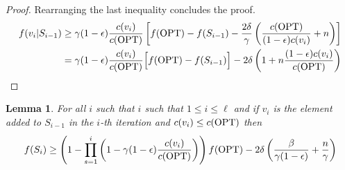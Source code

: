 \documentclass[10pt]{article} %
\newtheorem{lemma}[theorem]{Lemma}
\theoremstyle{remark}
\newcommand{\OPT}{{\rm OPT}}
\begin{document}
\begin{proof}
Rearranging the last inequality concludes the proof. 
\begin{align*}
    f(v_i|S_{i-1}) &\geq \gamma(1-\epsilon)\frac{c(v_i)}{c(\OPT)} \left[f(\OPT)-f(S_{i-1}) - \frac{2\delta}{\gamma} \left( \frac{c(\OPT)}{(1-\epsilon)c(v_i)} + n\right) \right]\\
    &= \gamma(1-\epsilon)\frac{c(v_i)}{c(\OPT)} \Big[ f(\OPT)-f(S_{i-1})\Big] - 2\delta  \left( 1+n\frac{(1-\epsilon)c(v_i)}{ c(\OPT)} \right) 
\end{align*}
\end{proof}

\begin{lemma}
\label{lem:f-Si-approx}
For all $i$ such that $i$ such that $1 \leq i \leq \ell$ and if $v_i$ is the element added to $S_{i-1}$ in the $i$-th iteration and $c(v_i) \leq c(\OPT)$ then
\[ 
f(S_{i}) \geq \left(   1- \prod_{s=1}^{i} \left(1- \gamma(1-\epsilon) \frac{c(v_i)}{c(\OPT)} \right)   \right) f(\OPT) - 2\delta\left(\frac{\beta}{\gamma(1-\epsilon)}+ \frac{n}{\gamma}\right)
\]
\end{lemma}
\end{document}
